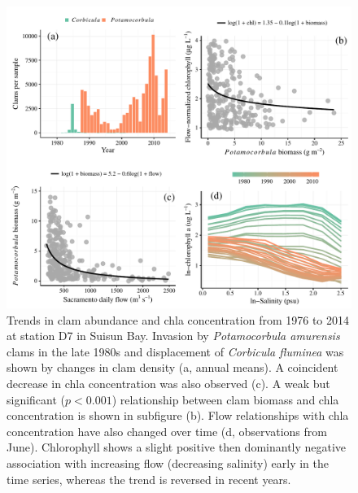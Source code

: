 \documentclass[letterpaper,12pt,oneside]{article}\usepackage[]{graphicx}\usepackage[]{color}
\begin{document}
\begin{figure}[!ht]

{\centering \includegraphics[width=\textwidth]{figs/clmchl-1} 

}

\caption{Trends in clam abundance and \ac{chla} concentration from 1976 to 2014 at station D7 in Suisun Bay.  Invasion by \textit{Potamocorbula amurensis} clams in the late 1980s and displacement of \textit{Corbicula fluminea} was shown by changes in clam density (a, annual means).  A coincident decrease in \ac{chla} concentration was also observed (c).  A weak but significant ($p < 0.001$) relationship between clam biomass and \ac{chla} concentration is shown in subfigure (b).  Flow relationships with \ac{chla} concentration have also changed over time (d, observations from June). Chlorophyll shows a slight positive then dominantly negative association with increasing flow (decreasing salinity) early in the time series, whereas the trend is reversed in recent years.}\label{fig:clmchl}
\end{figure}
\end{document}
